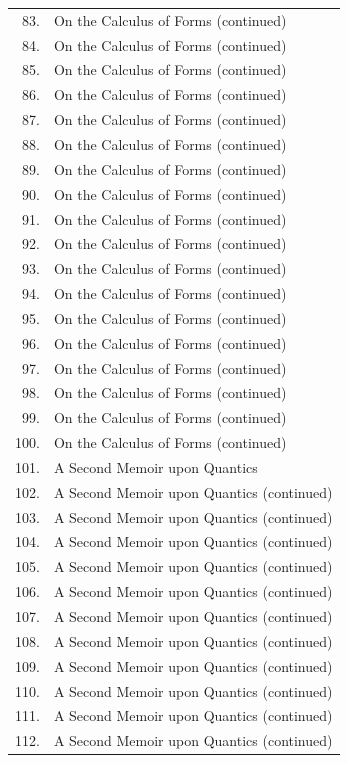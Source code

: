 \documentclass[11pt,a4paper]{article}
\begin{document}
\begin{longtable}{rp{}}
83. & On the Calculus of Forms (continued) \\
84. & On the Calculus of Forms (continued) \\
85. & On the Calculus of Forms (continued) \\
86. & On the Calculus of Forms (continued) \\
87. & On the Calculus of Forms (continued) \\
88. & On the Calculus of Forms (continued) \\
89. & On the Calculus of Forms (continued) \\
90. & On the Calculus of Forms (continued) \\
91. & On the Calculus of Forms (continued) \\
92. & On the Calculus of Forms (continued) \\
93. & On the Calculus of Forms (continued) \\
94. & On the Calculus of Forms (continued) \\
95. & On the Calculus of Forms (continued) \\
96. & On the Calculus of Forms (continued) \\
97. & On the Calculus of Forms (continued) \\
98. & On the Calculus of Forms (continued) \\
99. & On the Calculus of Forms (continued) \\
100. & On the Calculus of Forms (continued) \\
101. & A Second Memoir upon Quantics \\
102. & A Second Memoir upon Quantics (continued) \\
103. & A Second Memoir upon Quantics (continued) \\
104. & A Second Memoir upon Quantics (continued) \\
105. & A Second Memoir upon Quantics (continued) \\
106. & A Second Memoir upon Quantics (continued) \\
107. & A Second Memoir upon Quantics (continued) \\
108. & A Second Memoir upon Quantics (continued) \\
109. & A Second Memoir upon Quantics (continued) \\
110. & A Second Memoir upon Quantics (continued) \\
111. & A Second Memoir upon Quantics (continued) \\
112. & A Second Memoir upon Quantics (continued) \\

\end{longtable}
\end{document}
